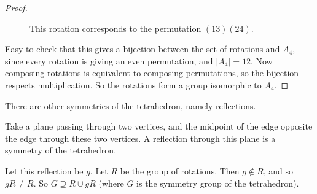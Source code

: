 \documentclass{article}
\theoremstyle{definition}
\begin{document}
\begin{proof}
\begin{figure}[!tbp]
      \centering
      \begin{minipage}[b]{0.4\textwidth}
        \end{minipage}
      \hfill
      \begin{minipage}[b]{0.4\textwidth}
      \label{fig:lookingdownedge}
      \centering
        \end{minipage}
      \label{fig:lookingdownedge}
      \caption{This rotation corresponds to the permutation $(13)(24)$.}
    \end{figure}
    Easy to check that this gives a bijection between the set of rotations and $A_4$, since every rotation is giving an even permutation, and $|A_4|=12$.  Now composing rotations is equivalent to composing permutations, so the bijection respects multiplication. So the rotations form a group isomorphic to $A_4$.
  \end{proof}

  There are other symmetries of the tetrahedron, namely reflections.

  Take a plane passing through two vertices, and the midpoint of the edge opposite the edge through these two vertices. A reflection through this plane is a symmetry of the tetrahedron. 

  Let this reflection be $g$. Let $R$ be the group of rotations. Then $g \not\in R$, and so $gR \neq R$. So $G \supseteq R \cup gR$ (where $G$ is the symmetry group of the tetrahedron). 
\end{document}
